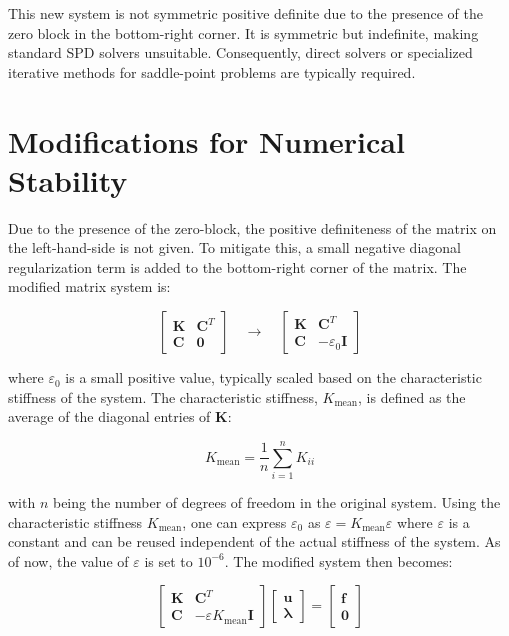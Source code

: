 This new system is not symmetric positive definite due to the presence of the zero block in the bottom-right corner.
It is symmetric but indefinite, making standard SPD solvers unsuitable.
Consequently, direct solvers or specialized iterative methods for saddle-point problems are typically required.

\section{Modifications for Numerical Stability}

Due to the presence of the zero-block, the positive definiteness of the matrix on the left-hand-side is not given.
To mitigate this, a small negative diagonal regularization term is added to the bottom-right corner of the matrix. The modified matrix system is:

\begin{equation}
\begin{bmatrix}
\mathbf{K} & \mathbf{C}^T \\
\mathbf{C} & \mathbf{0}
\end{bmatrix}
\quad \longrightarrow \quad
\begin{bmatrix}
\mathbf{K} & \mathbf{C}^T \\
\mathbf{C} & -\varepsilon_0 \mathbf{I}
\end{bmatrix}
\end{equation}

where \(\varepsilon_0\) is a small positive value, typically scaled based on the characteristic stiffness of the system.
The characteristic stiffness, \( K_{\text{mean}} \), is defined as the average of the diagonal entries of \(\mathbf{K}\):

\begin{equation}
K_{\text{mean}} = \frac{1}{n} \sum_{i=1}^{n} K_{ii}
\end{equation}

with \( n \) being the number of degrees of freedom in the original system. Using the characteristic stiffness $K_{\text{mean}}$, one can express
\(\varepsilon_0\) as \(\varepsilon = K_{\text{mean}} \varepsilon\) where \(\varepsilon\) is a constant
and can be reused independent of the actual stiffness of the system. As of now, the value of \(\varepsilon\) is set to \(10^{-6}\).
The modified system then becomes:

\begin{equation}
\begin{bmatrix}
\mathbf{K} & \mathbf{C}^T \\
\mathbf{C} & -\varepsilon K_{\text{mean}} \mathbf{I}
\end{bmatrix}
\begin{bmatrix}
\boldsymbol{u} \\
\boldsymbol{\lambda}
\end{bmatrix}
=
\begin{bmatrix}
\boldsymbol{f} \\
\boldsymbol{0}
\end{bmatrix}
\end{equation}

